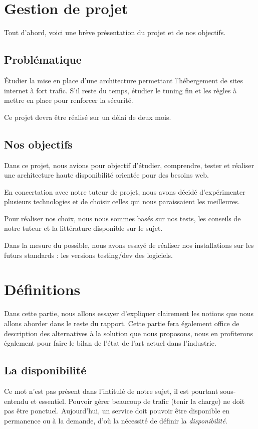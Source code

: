 \documentclass[a4paper,10pt,one side,titlepage]{report}
\begin{document}
\chapter{Gestion de projet}
Tout d'abord, voici une brève présentation du projet et de nos objectifs.
\section{Problématique}
Étudier la mise en place d'une architecture permettant l'hébergement de sites 
internet à fort trafic. S'il reste du temps, étudier le tuning fin et les règles à 
mettre en place pour renforcer la sécurité.

Ce projet devra être réalisé sur un délai de deux mois.

\section{Nos objectifs}
Dans ce projet, nous avions pour objectif d'étudier, comprendre, tester et réaliser 
une architecture haute disponibilité orientée pour des besoins web.

En concertation avec notre tuteur de projet, nous avons décidé d'expérimenter plusieurs
technologies et de choisir celles qui nous paraissaient les meilleures. 

Pour réaliser nos choix, nous nous sommes basés sur nos tests, les conseils de notre
tuteur et la littérature disponible sur le sujet.

Dans la mesure du possible, nous avons essayé de réaliser nos installations sur les
futurs standards : les versions testing/dev des logiciels.

\chapter{Définitions}
Dans cette partie, nous allons essayer d'expliquer clairement les notions que nous
allons aborder dans le reste du rapport. Cette partie fera également office de 
description des alternatives à la solution que nous proposons, nous en profiterons
également pour faire le bilan de l'état de l'art actuel dans l'industrie.
\section{La disponibilité}
Ce mot n'est pas présent dans l'intitulé de notre sujet, il est pourtant sous-entendu
et essentiel. Pouvoir gérer beaucoup de trafic (tenir la charge) ne doit pas être 
ponctuel. Aujourd'hui, un service doit pouvoir être disponible en permanence ou à 
la demande, d'où la nécessité de définir la \emph{disponibilité}. 
\end{document}

